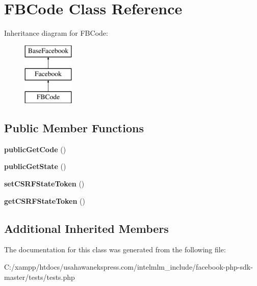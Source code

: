 \hypertarget{class_f_b_code}{\section{F\-B\-Code Class Reference}
\label{class_f_b_code}
}
Inheritance diagram for F\-B\-Code\-:\begin{figure}[H]
\begin{center}
\leavevmode
\includegraphics[height=3.000000cm]{class_f_b_code}
\end{center}
\end{figure}
\subsection*{Public Member Functions}
\begin{DoxyCompactItemize}
\item 
\hypertarget{class_f_b_code_ac36833d97568ebc293c1266811b447e7}{{\bfseries public\-Get\-Code} ()}\label{class_f_b_code_ac36833d97568ebc293c1266811b447e7}

\item 
\hypertarget{class_f_b_code_a6009a8caf5dc6d980363ea7d251d0c88}{{\bfseries public\-Get\-State} ()}\label{class_f_b_code_a6009a8caf5dc6d980363ea7d251d0c88}

\item 
\hypertarget{class_f_b_code_a08d1976d96314eee153ef2198837cd5d}{{\bfseries set\-C\-S\-R\-F\-State\-Token} ()}\label{class_f_b_code_a08d1976d96314eee153ef2198837cd5d}

\item 
\hypertarget{class_f_b_code_a5f044b097f88b06c4f7ee3d56893a186}{{\bfseries get\-C\-S\-R\-F\-State\-Token} ()}\label{class_f_b_code_a5f044b097f88b06c4f7ee3d56893a186}

\end{DoxyCompactItemize}
\subsection*{Additional Inherited Members}


The documentation for this class was generated from the following file\-:\begin{DoxyCompactItemize}
\item 
C\-:/xampp/htdocs/usahawanekspress.\-com/intelmlm\-\_\-include/facebook-\/php-\/sdk-\/master/tests/tests.\-php\end{DoxyCompactItemize}

